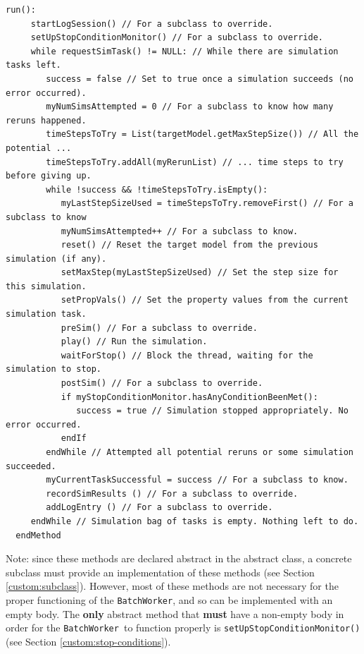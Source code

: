 \documentclass{article}
\newcommand{\BW}{{\tt BatchWorker}}
\begin{document}
\begin{lstlisting}[]
  run():
     startLogSession() // For a subclass to override.
     setUpStopConditionMonitor() // For a subclass to override.
     while requestSimTask() != NULL: // While there are simulation tasks left.
        success = false // Set to true once a simulation succeeds (no error occurred).
        myNumSimsAttempted = 0 // For a subclass to know how many reruns happened.
        timeStepsToTry = List(targetModel.getMaxStepSize()) // All the potential ...
        timeStepsToTry.addAll(myRerunList) // ... time steps to try before giving up.
        while !success && !timeStepsToTry.isEmpty():
           myLastStepSizeUsed = timeStepsToTry.removeFirst() // For a subclass to know
           myNumSimsAttempted++ // For a subclass to know.
           reset() // Reset the target model from the previous simulation (if any).
           setMaxStep(myLastStepSizeUsed) // Set the step size for this simulation.
           setPropVals() // Set the property values from the current simulation task.
           preSim() // For a subclass to override.
           play() // Run the simulation.
           waitForStop() // Block the thread, waiting for the simulation to stop.
           postSim() // For a subclass to override.
           if myStopConditionMonitor.hasAnyConditionBeenMet():
              success = true // Simulation stopped appropriately. No error occurred.
           endIf
        endWhile // Attempted all potential reruns or some simulation succeeded.
        myCurrentTaskSuccessful = success // For a subclass to know.
        recordSimResults () // For a subclass to override.
        addLogEntry () // For a subclass to override.
     endWhile // Simulation bag of tasks is empty. Nothing left to do.
  endMethod
\end{lstlisting}

\begin{sideblock}
Note: since these methods are declared abstract in the abstract  class, a concrete subclass must provide an implementation of these methods (see Section \ref{custom:subclass}). However, most of these methods are not necessary for the proper functioning of the \BW, and so can be implemented with an empty body. The \textbf{only}  abstract method that \textbf{must} have a non-empty body in order for the \BW\ to function properly is {\tt setUpStopConditionMonitor()} (see Section \ref{custom:stop-conditions}).
\end{sideblock}
\end{document}
